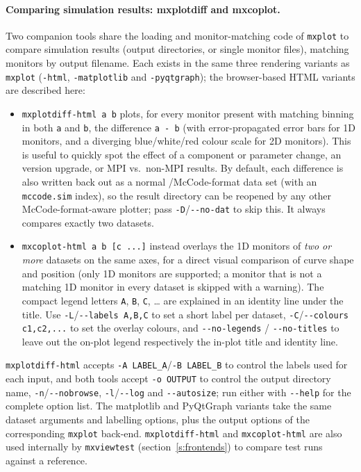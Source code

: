 \paragraph{Comparing simulation results: mxplotdiff and mxcoplot.}
Two companion tools share the loading and monitor-matching code of
\texttt{mxplot} to compare simulation results (output directories, or single
monitor files), matching monitors by output filename. Each exists in the same
three rendering variants as \texttt{mxplot} (\texttt{-html},
\texttt{-matplotlib} and \texttt{-pyqtgraph}); the browser-based HTML variants
are described here:
\begin{itemize}
\item \verb+mxplotdiff-html a b+ plots, for every monitor present with
  matching binning in both \texttt{a} and \texttt{b}, the difference
  \texttt{a - b} (with error-propagated error bars for 1D monitors, and a
  diverging blue/white/red colour scale for 2D monitors). This is useful to
  quickly spot the effect of a component or parameter change, an \MCX version
  upgrade, or MPI vs.\ non-MPI results. By default, each difference is also
  written back out as a normal \MCX/McCode-format data set (with an
  \texttt{mccode.sim} index), so the result directory can be reopened by any
  other McCode-format-aware plotter; pass \verb+-D+/\verb+--no-dat+ to skip this.
It always compares exactly two datasets.
\item \verb+mxcoplot-html a b [c ...]+ instead overlays the 1D monitors of
  \emph{two or more} datasets on the same axes, for a direct visual comparison
  of curve shape and position (only 1D monitors are supported; a monitor that
  is not a matching 1D monitor in every dataset is skipped with a warning).
  The compact legend letters \texttt{A}, \texttt{B}, \texttt{C}, \ldots{} are
  explained in an identity line under the title. Use
  \verb+-L+/\verb+--labels A,B,C+ to set a short label per dataset,
  \verb+-C+/\verb+--colours c1,c2,...+ to set the overlay colours, and
  \verb+--no-legends+ / \verb+--no-titles+ to leave out the on-plot legend
  respectively the in-plot title and identity line.
\end{itemize}
\texttt{mxplotdiff-html} accepts \verb+-A LABEL_A+/\verb+-B LABEL_B+ to control
the labels used for each input, and both tools accept \verb+-o OUTPUT+ to
control the output directory name, \verb+-n+/\verb+--nobrowse+, \verb+-l+/\verb+--log+
and \verb+--autosize+; run either with \verb+--help+ for the complete option
list. The matplotlib and PyQtGraph variants take the same dataset arguments and
labelling options, plus the output options of the corresponding \texttt{mxplot}
back-end. \texttt{mxplotdiff-html} and \texttt{mxcoplot-html} are also used
internally by \texttt{mxviewtest} (section~\ref{s:frontends}) to compare test
runs against a reference.


